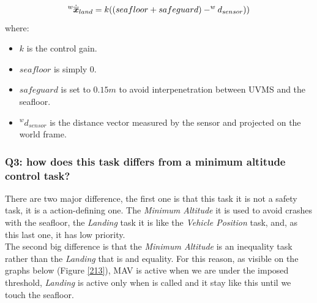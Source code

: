 \documentclass{article}
\begin{document}
\begin{equation}
\large
    ^{w}\dot{\overline{\boldsymbol{x}}}_{land} = k((seafloor + safeguard) - ^w d_{sensor})) %
\end{equation}
where:
\begin{itemize}
    \item $k$ is the control gain.
    \item $seafloor$ is simply 0.
    \item $safeguard$ is set to $0.15m$  to avoid interpenetration between UVMS and the seafloor.
    \item $^w d_{sensor}$ is the distance vector measured by the sensor and projected on the world frame.
\end{itemize} 


\subsubsection{Q3: how does this task differs from a minimum altitude control task?}
There are two major difference, the first one is that this task it is not a safety task, it is a action-defining one. The \textit{Minimum Altitude} it is used to avoid crashes with the seafloor, the \textit{Landing} task it is like the \textit{Vehicle Position} task, and, as this last one, it has low priority.\\
The second big difference is that the \textit{Minimum Altitude} is an inequality task rather than the \textit{Landing} that is and equality. For this reason, as visible on the graphs below (Figure \ref{213}), MAV is active when we are under the imposed threshold, \textit{Landing} is active only when is called and it stay like this until we touch the seafloor.
\end{document}
